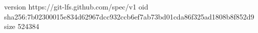 version https://git-lfs.github.com/spec/v1
oid sha256:7b02300015e834d62967dcc932ccb6ef7ab73bd01cda86f325ad1808b8f852d9
size 524384
